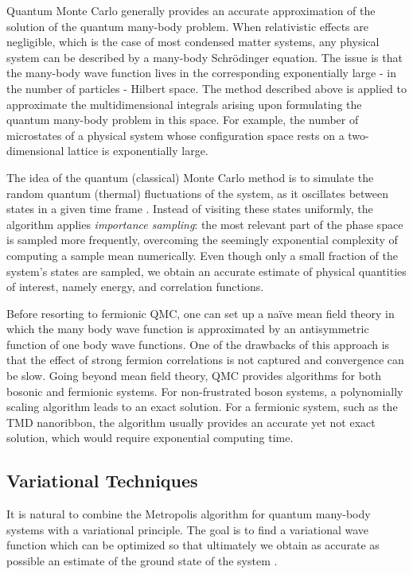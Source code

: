 \documentclass[10pt, twocolumn, twoside]{article}
\begin{document}
Quantum Monte Carlo generally provides an accurate approximation of the solution of the quantum many-body problem. When relativistic effects are negligible, which is the case of most condensed matter systems, any physical system can be described by a many-body Schr\"odinger equation. The issue is that the many-body wave function lives in the corresponding exponentially large - in the number of particles - Hilbert space. The method described above is applied to approximate the multidimensional integrals arising upon formulating the quantum many-body problem in this space. For example, the number of microstates of a physical system whose configuration space rests on a two-dimensional lattice is exponentially large.

The idea of the quantum (classical) Monte Carlo method is to simulate the random quantum (thermal) fluctuations of the system, as it oscillates between states in a given time frame \cite{newman_barkema}. Instead of visiting these states uniformly, the algorithm applies \emph{importance sampling}: the most relevant part of the phase space is sampled more frequently, overcoming the seemingly exponential complexity of computing a sample mean numerically. Even though only a small fraction of the system's states are sampled, we obtain an accurate estimate of physical quantities of interest, namely energy, and correlation functions.\par

Before resorting to fermionic QMC, one can set up a na\"ive mean field theory in which the many body wave function is approximated by an antisymmetric function of one body wave functions. One of the drawbacks of this approach is that the effect of strong fermion correlations is not captured and convergence can be slow. Going beyond mean field theory, QMC provides algorithms for both bosonic and fermionic systems. For non-frustrated boson systems, a polynomially scaling algorithm leads to an exact solution. For a fermionic system, such as the TMD nanoribbon, the algorithm usually provides an accurate yet not exact solution, which would require exponential computing time.\par


\subsection{Variational Techniques}

It is natural to combine the Metropolis algorithm for quantum many-body systems with a variational principle. The goal is to find a variational wave function which can be optimized so that ultimately we obtain as accurate as possible an estimate of the ground state of the system \cite{tao}.\par
\end{document}
